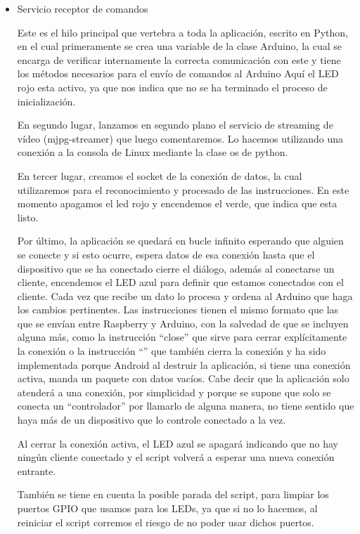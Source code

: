 \documentclass{pclass}
\begin{document}
\begin{itemize}
\begin{itemize}
	\medskip
	
	\item Servicio receptor de comandos
	
	Este es el hilo principal que vertebra a toda la aplicación, escrito en Python, en el cual primeramente se crea una variable de la clase Arduino, la cual se encarga de verificar internamente la correcta comunicación con este y tiene los métodos necesarios para el envío de comandos al Arduino Aquí el LED rojo esta activo, ya que nos indica que no se ha terminado el proceso de inicialización.
	
	En segundo lugar, lanzamos en segundo plano el servicio de streaming de vídeo (mjpg-streamer) que luego comentaremos. Lo hacemos utilizando una conexión a la consola de Linux mediante la clase os de python. 
	
	En tercer lugar, creamos el socket de la conexión de datos, la cual utilizaremos para el reconocimiento y procesado de las instrucciones. En este momento apagamos el led rojo y encendemos el verde, que indica que esta listo.
	
	Por último, la aplicación se quedará en bucle infinito esperando que alguien se conecte y si esto ocurre, espera datos de esa conexión hasta que el dispositivo que se ha conectado cierre el diálogo, además al conectarse un cliente, encendemos el LED azul para definir que estamos conectados con el cliente. Cada vez que recibe un dato lo procesa y ordena al Arduino que haga los cambios pertinentes. Las instrucciones tienen el mismo formato que las que se envían entre Raspberry y Arduino, con la salvedad de que se incluyen alguna más, como la instrucción ``close'' que sirve para cerrar explícitamente la conexión o la instrucción ``'' que también cierra la conexión y ha sido implementada porque Android al destruir la aplicación, si tiene una conexión activa, manda un paquete con datos vacíos. Cabe decir que la aplicación solo atenderá a una conexión, por simplicidad y porque se supone que solo se conecta un ``controlador'' por llamarlo de alguna manera, no tiene sentido que haya más de un dispositivo que lo controle conectado a la vez. 
	
	Al cerrar la conexión activa, el LED azul se apagará indicando que no hay ningún cliente conectado y el script volverá a esperar una nueva conexión entrante.
	
	También se tiene en cuenta la posible parada del script, para limpiar los puertos GPIO que usamos para los LEDs, ya que si no lo hacemos, al reiniciar el script corremos el riesgo de no poder usar dichos puertos.
	

\end{itemize}
\end{itemize}
\end{document}
